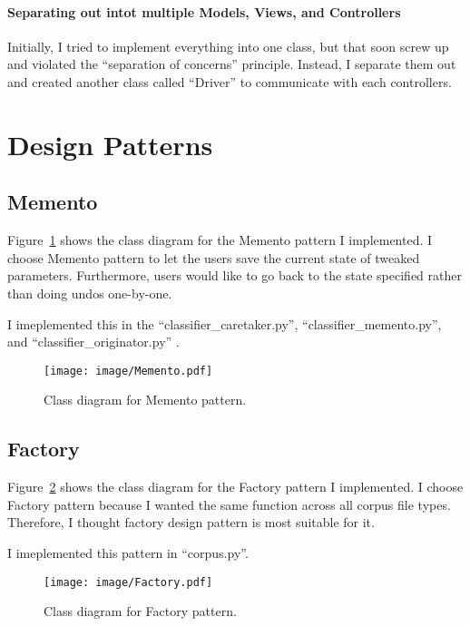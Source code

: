 \documentclass[11pt]{article}
\begin{document}
\paragraph{Separating out intot multiple Models, Views, and Controllers}
Initially, I tried to implement everything into one class, but that soon screw up and violated the ``separation of concerns'' principle. 
Instead, I separate them out and created another class called ``Driver'' to communicate with each controllers. 

\section{Design Patterns}
\label{sec:design}

\subsection{Memento}
Figure~\ref{fig:memento} shows the class diagram for the Memento pattern I implemented. 
I choose Memento pattern to let the users save the current state of tweaked parameters. 
Furthermore, users would like to go back to the state specified rather than doing undos one-by-one. 

I imeplemented this in the ``classifier\_caretaker.py'',  ``classifier\_memento.py'', and ``classifier\_originator.py'' . 

\begin{figure}[htb]
 \centering
     {\texttt{[image: image/Memento.pdf]}}
    \vspace{-2ex}
     \caption{\label{fig:memento}  
        Class diagram for Memento pattern.
     }
\end{figure}

\subsection{Factory}
Figure~\ref{fig:factory} shows the class diagram for the Factory pattern I implemented. 
I choose Factory pattern because I wanted the same function across all corpus file types. 
Therefore, I thought factory design pattern is most suitable for it. 

I imeplemented this pattern in ``corpus.py''.

\begin{figure}[htb]
 \centering
     {\texttt{[image: image/Factory.pdf]}}
    \vspace{-2ex}
     \caption{\label{fig:factory}  
        Class diagram for Factory pattern.
     }
\end{figure}
\end{document}
